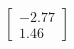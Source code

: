 \documentclass[preview]{standalone}
\begin{document}
\begin{align*}
\begin{bmatrix} -2.77 \\ 1.46 \end{bmatrix}
\end{align*}
\end{document}

